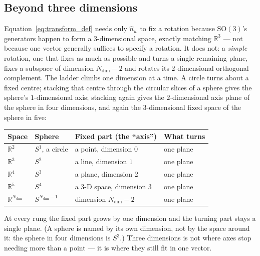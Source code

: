 \documentclass[12pt, a4paper]{article}
\begin{document}
\subsection{Beyond three dimensions}
\label{subsec:transform_higher_dim}
Equation~\eqref{eq:transform_def} needs only $\hat n_w$ to fix a
rotation because $\mathrm{SO}(3)$'s generators happen to form a
$3$-dimensional space, exactly matching $\mathbb{R}^3$ --- not
because one vector generally suffices to specify a rotation. It does
not: a \emph{simple} rotation, one that fixes as much as possible and
turns a single remaining plane, fixes a subspace of dimension
$N_{\mathrm{dim}}-2$ and rotates its $2$-dimensional orthogonal
complement. The ladder climbs one dimension at a time. A circle
turns about a fixed centre; stacking that centre through the circular
slices of a sphere gives the sphere's $1$-dimensional axis; stacking
again gives the $2$-dimensional axis plane of the sphere in four
dimensions, and again the $3$-dimensional fixed space of the sphere
in five:
\begin{center}
\begin{tabular}{llll}
Space & Sphere & Fixed part (the ``axis'') & What turns \\
\hline
$\mathbb{R}^2$ & $S^1$, a circle & a point, dimension $0$ & one plane \\
$\mathbb{R}^3$ & $S^2$ & a line, dimension $1$ & one plane \\
$\mathbb{R}^4$ & $S^3$ & a plane, dimension $2$ & one plane \\
$\mathbb{R}^5$ & $S^4$ & a $3$-D space, dimension $3$ & one plane \\
$\mathbb{R}^{N_{\mathrm{dim}}}$ & $S^{N_{\mathrm{dim}}-1}$ & dimension $N_{\mathrm{dim}}-2$ & one plane \\
\end{tabular}
\end{center}
At every rung the fixed part grows by one dimension and the turning
part stays a single plane. (A sphere is named by its own dimension,
not by the space around it: the sphere in four dimensions is $S^3$.)
Three dimensions is not where axes stop needing more than a point ---
it is where they still fit in one vector.
\end{document}
